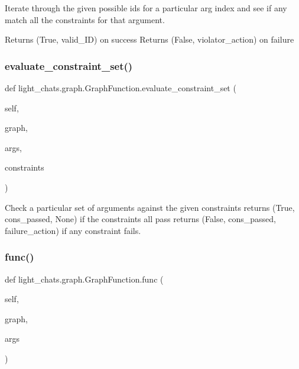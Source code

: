 \begin{DoxyVerb}Iterate through the given possible ids for a particular arg index and see if any
match all the constraints for that argument.

Returns (True, valid_ID) on success Returns (False, violator_action) on failure
\end{DoxyVerb}
 \mbox{\label{classlight__chats_1_1graph_1_1GraphFunction_a2110ae09489d9ebc9291a1fd39d8c4cd}} 
\subsubsection{\texorpdfstring{evaluate\+\_\+constraint\+\_\+set()}{evaluate\_constraint\_set()}}
{\footnotesize\ttfamily def light\+\_\+chats.\+graph.\+Graph\+Function.\+evaluate\+\_\+constraint\+\_\+set (\begin{DoxyParamCaption}\item[{}]{self,  }\item[{}]{graph,  }\item[{}]{args,  }\item[{}]{constraints }\end{DoxyParamCaption})}

\begin{DoxyVerb}Check a particular set of arguments against the given constraints returns (True,
cons_passed, None) if the constraints all pass returns (False, cons_passed,
failure_action) if any constraint fails.
\end{DoxyVerb}
 \mbox{\label{classlight__chats_1_1graph_1_1GraphFunction_a9fd67b8cadf1f9be60d4885d21287518}} 
\subsubsection{\texorpdfstring{func()}{func()}}
{\footnotesize\ttfamily def light\+\_\+chats.\+graph.\+Graph\+Function.\+func (\begin{DoxyParamCaption}\item[{}]{self,  }\item[{}]{graph,  }\item[{}]{args }\end{DoxyParamCaption})}


